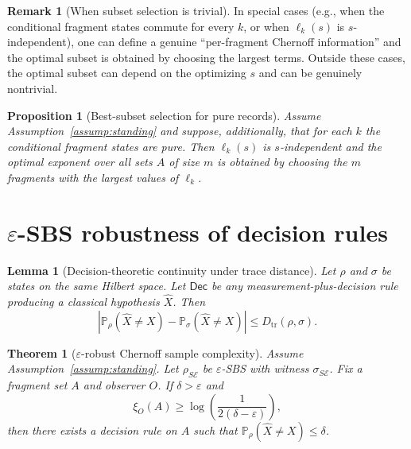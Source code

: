 \documentclass[aps,pra,twocolumn,superscriptaddress,nofootinbib]{revtex4-2}
\newcommand{\cE}{\mathcal{E}}
\newcommand{\Dtr}{D_{\mathrm{tr}}}
\newcommand{\1}{\mathbf{1}}
\newcommand{\QCBdist}{\xi}
\newcommand{\Prob}{\mathbb{P}}
\theoremstyle{definition}
\newtheorem{remark}{Remark}
\theoremstyle{plain}
\newtheorem{theorem}{Theorem}
\newtheorem{lemma}{Lemma}
\newtheorem{proposition}{Proposition}
\begin{document}
\begin{remark}[When subset selection is trivial]
In special cases (e.g., when the conditional fragment states commute for every $k$, or when $\ell_k(s)$ is $s$-independent), one can define a genuine ``per-fragment Chernoff information'' and the optimal subset is obtained by choosing the largest terms.
Outside these cases, the optimal subset can depend on the optimizing $s$ and can be genuinely nontrivial.
\end{remark}

\begin{proposition}[Best-subset selection for pure records]
\label{prop:best-subset}
Assume Assumption~\ref{assump:standing} and suppose, additionally, that for each $k$ the conditional fragment states are pure.
Then $\ell_k(s)$ is $s$-independent and the optimal exponent over all sets $A$ of size $m$ is obtained by choosing the $m$ fragments with the largest values of $\ell_k$.
\end{proposition}

\section{$\varepsilon$-SBS robustness of decision rules}

\begin{lemma}[Decision-theoretic continuity under trace distance]
\label{lem:decision-cont}
Let $\rho$ and $\sigma$ be states on the same Hilbert space.
Let $\mathsf{Dec}$ be any measurement-plus-decision rule producing a classical hypothesis $\widehat{X}$.
Then
\begin{equation}
\left|\Prob_{\rho}(\widehat{X}\neq X)-\Prob_{\sigma}(\widehat{X}\neq X)\right|
\le \Dtr(\rho,\sigma).
\label{eq:decision-cont}
\end{equation}
\end{lemma}

\begin{theorem}[$\varepsilon$-robust Chernoff sample complexity]
\label{thm:eps-robust}
Assume Assumption~\ref{assump:standing}.
Let $\rho_{S\cE}$ be $\varepsilon$-SBS with witness $\sigma_{S\cE}$.
Fix a fragment set $A$ and observer $O$.
If $\delta>\varepsilon$ and
\begin{equation}
\QCBdist_O(A)\ge \log\!\left(\frac{1}{2(\delta-\varepsilon)}\right),
\label{eq:eps-bound}
\end{equation}
then there exists a decision rule on $A$ such that $\Prob_{\rho}(\widehat{X}\neq X)\le \delta$.
\end{theorem}
\end{document}
